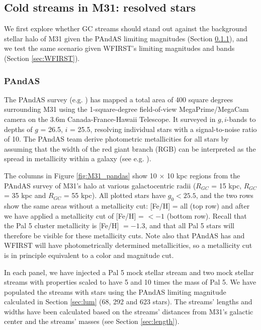 \documentclass[twocolumn]{aastex62}
\begin{document}
\subsection{Cold streams in M31: resolved stars}
\label{sec:resolved}
We first explore whether GC streams should stand out against the background stellar halo of M31 given the PAndAS limiting magnitudes (Section \ref{sec:PANDAS}), and we test the same scenario given WFIRST's limiting magnitudes and bands (Section \ref{sec:WFIRST}). 


\subsubsection{PAndAS}
\label{sec:PANDAS}
The PAndAS survey (e.g. \citealt{McConnachie18}) has mapped a total area of 400 square degrees surrounding M31 using the 1-square-degree field-of-view MegaPrime/MegaCam camera on the 3.6m Canada-France-Hawaii Telescope. It surveyed in $g, i$-bands to depths of $g$ = 26.5, $i$ = 25.5, resolving individual stars with a signal-to-noise ratio of 10. The PAndAS team derive photometric metallicities for all stars by assuming that the width of the red giant branch (RGB) can be interpreted as the spread in metallicity within a galaxy (see e.g. \citealt{crno14}).

The columns in Figure \ref{fig:M31_pandas} show 10 $\times$ 10 kpc regions from the PAndAS survey of M31's halo at various galactocentric radii ($R_{GC}$ = 15  kpc, $R_{GC}$ = 35 kpc and $R_{GC}$ = 55 kpc). All plotted stars have $g_0 < 25.5$, and the two rows show the same areas without a metallicity cut: [Fe/H] = all (top row) and after we have applied a metallicity cut of  [Fe/H] = $< -1 $ (bottom row). Recall that the Pal 5 cluster metallicity is  [Fe/H] $= -1.3$, and that all Pal 5 stars will therefore be visible for these metallicity cuts. Note also that PAndAS has and WFIRST will have photometrically determined metallicities, so a metallicity cut is in principle equivalent to a color and magnitude cut.

In each panel, we have injected a Pal 5 mock stellar stream and two mock stellar streams with properties scaled to have 5 and 10 times  the mass of Pal 5. We have populated the streams with stars using the PAndAS limiting magnitude calculated in Section \ref{sec:lum} (68, 292 and 623 stars).  
The streams' lengths and widths have been calculated based on the streams' distances from M31's galactic center and the streams' masses (see Section \ref{sec:length}). 
\end{document}
